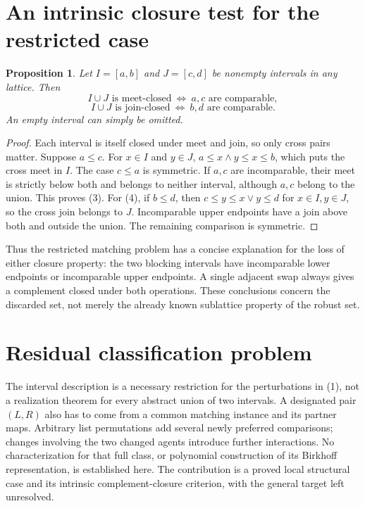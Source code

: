 \documentclass[11pt]{article}
\newtheorem{proposition}[theorem]{Proposition}
\theoremstyle{definition}
\begin{document}
\section*{An intrinsic closure test for the restricted case}
\begin{proposition}
Let $I=[a,b]$ and $J=[c,d]$ be nonempty intervals in any lattice. Then
\[
 I\cup J\text{ is meet-closed}\ \Longleftrightarrow\ a,c
       \text{ are comparable},                           \tag{3}
\]
\[
 I\cup J\text{ is join-closed}\ \Longleftrightarrow\ b,d
       \text{ are comparable}.                           \tag{4}
\]
An empty interval can simply be omitted.
\end{proposition}
\begin{proof}
Each interval is itself closed under meet and join, so only cross pairs
matter. Suppose $a\le c$. For $x\in I$ and $y\in J$,
$a\le x\wedge y\le x\le b$, which puts the cross meet in $I$.
The case $c\le a$ is symmetric. If $a,c$ are incomparable, their meet
is strictly below both and belongs to neither interval, although $a,c$
belong to the union. This proves (3).
For (4), if $b\le d$, then $c\le y\le x\vee y\le d$ for
$x\in I,y\in J$, so the cross join belongs to $J$.
Incomparable upper endpoints have a join above both and outside the union.
The remaining comparison is symmetric.
\end{proof}

Thus the restricted matching problem has a concise explanation for the
loss of either closure property: the two blocking intervals have
incomparable lower endpoints or incomparable upper endpoints. A single
adjacent swap always gives a complement closed under both operations.
These conclusions concern the discarded set, not merely the already
known sublattice property of the robust set.

\section*{Residual classification problem}
The interval description is a necessary restriction for the perturbations
in (1), not a realization theorem for every abstract union of two
intervals. A designated pair $(L,R)$ also has to come from a common
matching instance and its partner maps. Arbitrary list permutations add
several newly preferred comparisons; changes involving the two changed
agents introduce further interactions. No characterization for that full
class, or polynomial construction of its Birkhoff representation, is
established here. The contribution is a proved local structural case and
its intrinsic complement-closure criterion, with the general target left
unresolved.
\end{document}
